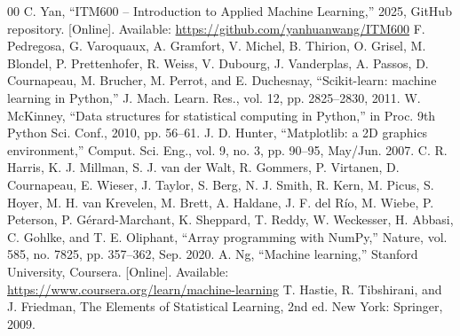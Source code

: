 \documentclass[conference]{IEEEtran}
\begin{document}
\begin{thebibliography}{00}
 C. Yan, ``ITM600 -- Introduction to Applied Machine Learning,'' 2025, GitHub repository. [Online]. Available: \url{https://github.com/yanhuanwang/ITM600}
 F. Pedregosa, G. Varoquaux, A. Gramfort, V. Michel, B. Thirion, O. Grisel, M. Blondel, P. Prettenhofer, R. Weiss, V. Dubourg, J. Vanderplas, A. Passos, D. Cournapeau, M. Brucher, M. Perrot, and E. Duchesnay, ``Scikit-learn: machine learning in Python,'' J. Mach. Learn. Res., vol. 12, pp. 2825--2830, 2011.
 W. McKinney, ``Data structures for statistical computing in Python,'' in Proc. 9th Python Sci. Conf., 2010, pp. 56--61.
 J. D. Hunter, ``Matplotlib: a 2D graphics environment,'' Comput. Sci. Eng., vol. 9, no. 3, pp. 90--95, May/Jun. 2007.
 C. R. Harris, K. J. Millman, S. J. van der Walt, R. Gommers, P. Virtanen, D. Cournapeau, E. Wieser, J. Taylor, S. Berg, N. J. Smith, R. Kern, M. Picus, S. Hoyer, M. H. van Krevelen, M. Brett, A. Haldane, J. F. del R\'{i}o, M. Wiebe, P. Peterson, P. G\'{e}rard-Marchant, K. Sheppard, T. Reddy, W. Weckesser, H. Abbasi, C. Gohlke, and T. E. Oliphant, ``Array programming with NumPy,'' Nature, vol. 585, no. 7825, pp. 357--362, Sep. 2020.
 A. Ng, ``Machine learning,'' Stanford University, Coursera. [Online]. Available: \url{https://www.coursera.org/learn/machine-learning}
 T. Hastie, R. Tibshirani, and J. Friedman, The Elements of Statistical Learning, 2nd ed. New York: Springer, 2009.
\end{thebibliography}
\end{document}
